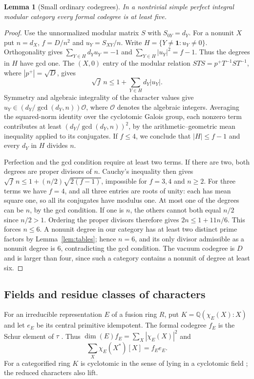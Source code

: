\documentclass[11pt,a4paper]{article}
\numberwithin{equation}{section}
\newtheorem{lemma}[theorem]{Lemma}
\theoremstyle{remark}
\newcommand{\one}{\mathbf1}
\newcommand{\QQ}{\mathbb Q}
\begin{document}
\begin{lemma}[Small ordinary codegrees]\label{lem:small-ordinary-codegrees}
In a nontrivial simple perfect integral modular category every formal codegree
is at least five.
\end{lemma}
\begin{proof}
Use the unnormalized modular matrix $S$ with $S_{0Y}=d_Y$.
For a nonunit $X$ put $n=d_X$, $f=D/n^2$ and
$u_Y=S_{XY}/n$. Write $H=\{Y\ne\one:u_Y\ne0\}$.
Orthogonality gives $\sum_{Y\in H} d_Yu_Y=-1$ and
$\sum_{Y\in H}|u_Y|^2=f-1$. Thus the degrees in $H$ have gcd one.
The $(X,0)$ entry of the modular relation $STS=p^+T^{-1}ST^{-1}$,
where $|p^+|=\sqrt D$, gives
\[
             \sqrt f\,n\le 1+\sum_{Y\in H}d_Y|u_Y|.
\]
Symmetry and algebraic integrality of the character values give
$u_Y\in(d_Y/\gcd(d_Y,n))\mathcal O$, where $\mathcal O$ denotes the
algebraic integers. Averaging the squared-norm identity over the
cyclotomic Galois group, each nonzero term contributes at least
$(d_Y/\gcd(d_Y,n))^2$, by the arithmetic--geometric mean inequality
applied to its conjugates. If $f\le4$, we conclude that
$|H|\le f-1$ and every $d_Y$ in $H$ divides $n$.

Perfection and the gcd condition require at least two terms. If there
are two, both degrees are proper divisors of $n$. Cauchy's inequality
then gives $\sqrt f\,n\le1+(n/2)\sqrt{2(f-1)}$, impossible for
$f=3,4$ and $n\ge2$. For three terms we have $f=4$, and all three
entries are roots of unity: each has mean square one, so all its
conjugates have modulus one. At most one of the degrees can be $n$,
by the gcd condition. If one is $n$, the others cannot both equal
$n/2$ since $n/2>1$. Ordering the proper divisors therefore gives
$2n\le1+11n/6$. This forces $n\le6$. A nonunit degree in our category has at least two distinct prime factors
by Lemma~\ref{lem:tables}; hence $n=6$, and its only divisor
admissible as a nonunit degree is $6$, contradicting the gcd condition.
The vacuum codegree is $D$ and is larger than four, since such a
category contains a nonunit of degree at least six.
\end{proof}

\subsection{Fields and residue classes of characters}\label{fam:M:sec:2.1}
For an irreducible representation $E$ of a fusion ring $R$, put $K=\QQ(\chi_E(X):X)$ and let $e_E$ be its central primitive idempotent. The formal codegree $f_E$ is the Schur element of $\tau$ \cite[Proposition~1.15]{ChlSchur}. Thus $\dim(E) f_E=\sum_X|\chi_E(X)|^2$ and \cite[Lemma~2.3]{OstrikFormalCodegrees}
\begin{equation}\label{eq:character-formal-codegree-general}
 \sum_X\chi_E(X^*)[X]=f_Ee_E .
\end{equation}
For a categorified ring $K$ is cyclotomic in the sense of lying in a cyclotomic field \cite[Theorem~8.51]{ENOannals}; the reduced characters also lift.
\end{document}
